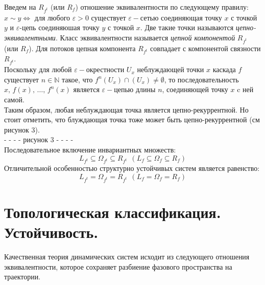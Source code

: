 \noindent Введем на \(R_{f^t}\) (или \(R_f\)) отношение эквивалентности по следующему правилу: \\
\(x \sim y \Leftrightarrow\) для любого \(\varepsilon > 0\) существует \(\varepsilon - \text{сетью}\) соединяющая точку \(x\) с точкой \(y\) и \(\varepsilon\)-цепь соединяюшая точку \(y\) с точкой \(x\). 
Две такие точки называются \textit{цепно-эквивалентными}. Класс эквивалентности называется \textit{цепной компонентой} \(R_{f^t}\) (или \(R_f\)). 
Для потоков цепная компонента \(R_{f^t}\) совпадает с компонентой связности \(R_{f^t}\). 
\\[2mm] 
Поскольку для любой \(\varepsilon - \text{окрестности}\) \(U_x\) неблуждающей точки \(x\) каскада \(f\) существует \(n \in \mathbb{N}\) такое, 
что \(f^n(U_x) \cap (U_x) \not = \emptyset\), то последовательность \(x,\, f(x),\, \dots,\, f^n(x)\) является \(\varepsilon - \text{цепью}\) длины \(n\),
соединяющей точку \(x\) c ней самой. 
\\[1mm]
Таким образом, любая неблуждающая точка является цепно-рекуррентной. Но стоит отметить, что блуждающая точка тоже может быть цепно-рекуррентной (см рисунок 3).\\
- - - - рисунок 3 - - - -
\\[2mm]
Последовательное включение инвариантных множеств: 
\[
    L_{f^t} \subseteq \Omega_{f^t} \subseteq R_{f^t} \ \ (L_{f} \subseteq \Omega_{f} \subseteq R_{f})\] 
Отличительной особенностью структурно устойчивых систем является равенство: 
\[
    L_{f^t} = \Omega_{f^t} = R_{f^t} \ \ (L_{f} = \Omega_{f} = R_{f})\]

\section{Топологическая классификация. Устойчивость.}

Качественная теория динамических систем исходит из следующего отношения эквивалентности, 
которое сохраняет разбиение фазового пространства на траектории.



